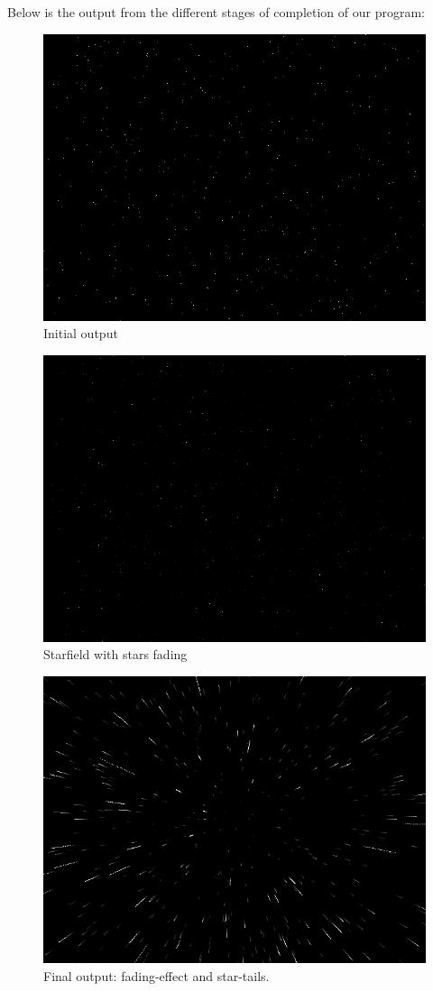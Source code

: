 \documentclass[a4paper,11pt]{article}
\begin{document}
Below is the output from the different stages of completion of our program:
\begin{figure}[h!]
	\centering
	\includegraphics[width=0.7\linewidth]{screenshot2.png}
	\caption{Initial output}
	\label{fig2}
\end{figure}
\begin{figure}[h!]
	\centering
	\includegraphics[width=0.7\linewidth]{screenshot3.png}
	\caption{Starfield with stars fading}
	\label{fig3}
\end{figure}
\begin{figure}[h!]
	\centering
	\includegraphics[width=0.7\linewidth]{screenshot4.png}
	\caption{Final output: fading-effect and star-tails.}
	\label{fig4}
\end{figure}
\end{document}

